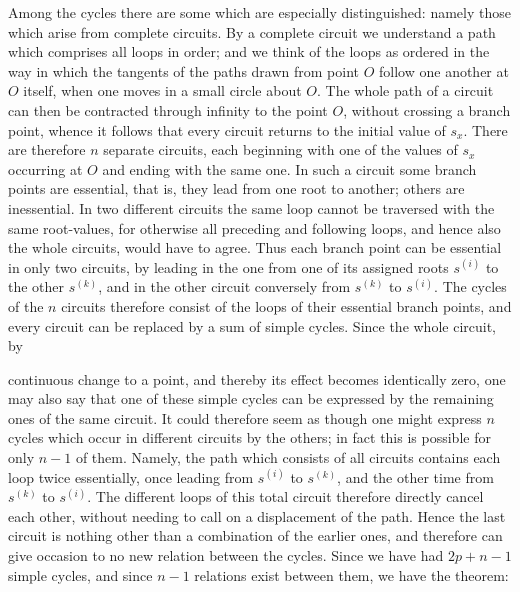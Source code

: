 \documentclass[10pt]{article}
\begin{document}
Among the cycles there are some which are especially distinguished: namely those which arise from complete circuits. By a complete circuit we understand a path which comprises all loops in order; and we think of the loops as ordered in the way in which the tangents of the paths drawn from point \(O\) follow one another at \(O\) itself, when one moves in a small circle about \(O\). The whole path of a circuit can then be contracted through infinity to the point \(O\), without crossing a branch point, whence it follows that every circuit returns to the initial value of \(s_x\). There are therefore \(n\) separate circuits, each beginning with one of the values of \(s_x\) occurring at \(O\) and ending with the same one. In such a circuit some branch points are essential, that is, they lead from one root to another; others are inessential. In two different circuits the same loop cannot be traversed with the same root-values, for otherwise all preceding and following loops, and hence also the whole circuits, would have to agree. Thus each branch point can be essential in only two circuits, by leading in the one from one of its assigned roots \(s^{(i)}\) to the other \(s^{(k)}\), and in the other circuit conversely from \(s^{(k)}\) to \(s^{(i)}\). The cycles of the \(n\) circuits therefore consist of the loops of their essential branch points, and every circuit can be replaced by a sum of simple cycles. Since the whole circuit, by



continuous change to a point, and thereby its effect becomes identically zero, one may also say that one of these simple cycles can be expressed by the remaining ones of the same circuit. It could therefore seem as though one might express \(n\) cycles which occur in different circuits by the others; in fact this is possible for only \(n-1\) of them. Namely, the path which consists of all circuits contains each loop twice essentially, once leading from \(s^{(i)}\) to \(s^{(k)}\), and the other time from \(s^{(k)}\) to \(s^{(i)}\). The different loops of this total circuit therefore directly cancel each other, without needing to call on a displacement of the path. Hence the last circuit is nothing other than a combination of the earlier ones, and therefore can give occasion to no new relation between the cycles. Since we have had \(2p+n-1\) simple cycles, and since \(n-1\) relations exist between them, we have the theorem:
\end{document}
